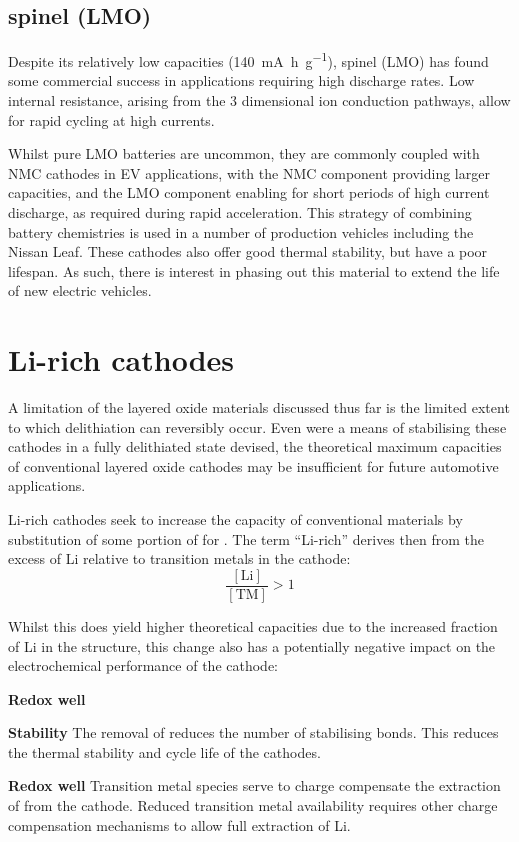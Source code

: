 \subsection{ spinel (LMO)}
Despite its relatively low capacities (\SI{140}{\milli\ampere\hour\per\gram}),  spinel (LMO) has found some commercial success in applications requiring high discharge rates.
Low internal resistance, arising from the 3 dimensional ion conduction pathways, allow for rapid cycling at high currents.

Whilst pure LMO batteries are uncommon, they are commonly coupled with NMC cathodes in EV applications, with the NMC component providing larger capacities, and the LMO component enabling for short periods of high current discharge, as required during rapid acceleration.
This strategy of combining battery chemistries is used in a number of production vehicles including the Nissan Leaf.\cite{Schmuch2018, Blomgren2017}
These cathodes also offer good thermal stability, but have a poor lifespan.
As such, there is interest in phasing out this material to extend the life of new electric vehicles.
\newpage
\section{Li-rich cathodes}
A limitation of the layered oxide materials discussed thus far is the limited extent to which delithiation can reversibly occur.
Even were a means of stabilising these cathodes in a fully delithiated state devised, the theoretical maximum capacities of conventional layered oxide cathodes may be insufficient for future automotive applications.

Li-rich cathodes seek to increase the capacity of conventional  materials by substitution of some portion of  for .
The term ``Li-rich'' derives then from the excess of Li relative to transition metals in the cathode:
\begin{equation}
	\frac{[\textrm{Li}]}{[\textrm{TM}]} > 1
\end{equation}

Whilst this does yield higher theoretical capacities due to the increased fraction of Li in the structure, this change also has a potentially negative impact on the electrochemical performance of the cathode:
\begin{labeling}{\textbf{Redox well}}
	\item [\textbf{Stability}] The removal of  reduces the number of stabilising  bonds.
	This reduces the thermal stability and cycle life of the cathodes.
	\item [\textbf{Redox well}] Transition metal species serve to charge compensate the extraction of  from the cathode.
	Reduced transition metal availability requires other charge compensation mechanisms to allow full extraction of Li.
	\end{labeling}

